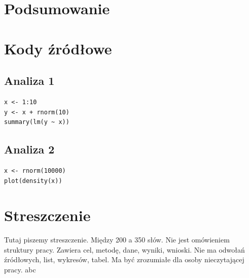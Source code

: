 \documentclass[12pt,a4paper,twoside,openany]{book}
\begin{document}
\clearpage

\chapter{Podsumowanie}



\clearpage
{}

\clearpage
{}
\listoffigures

\clearpage
\listoftables
{}

\appendix
\chapter*{Kody źródłowe}

\section*{Analiza 1}
\begin{verbatim}
x <- 1:10
y <- x + rnorm(10)
summary(lm(y ~ x))
\end{verbatim}

\section*{Analiza 2}
\begin{verbatim}
x <- rnorm(10000)
plot(density(x))
\end{verbatim}

\clearpage

\chapter*{Streszczenie}

Tutaj piszemy streszczenie. Między 200 a 350 słów. Nie jest omówieniem struktury pracy.
Zawiera cel, metodę, dane, wyniki, wnioski.
Nie ma odwołań źródłowych, list, wykresów, tabel. Ma być zrozumiałe dla osoby nieczytającej pracy.
\cite{Scarselli2009TheGN}
\cite{Hamilton2017InductiveRL}
abc
\clearpage



\end{document}
